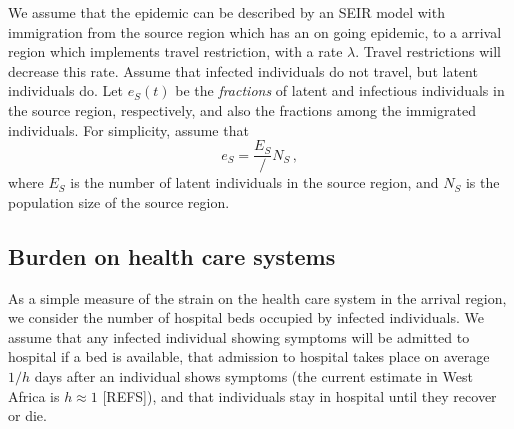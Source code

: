 \documentclass[12pt]{article}
\newcommand{\REFS}{{\color{red}[REFS]}\xspace}
\begin{document}
We assume that the epidemic can be described by an SEIR model with immigration from the source region which has an on going epidemic, to a arrival region which implements travel restriction, with a rate $\lambda$. Travel restrictions will decrease this rate. Assume that infected individuals do not travel, but latent individuals do. Let $e_S(t)$ be the \emph{fractions} of latent and infectious individuals in the source region, respectively, and also the fractions among the immigrated individuals. For simplicity, assume that
\begin{equation}
\label{eq:eS}
e_S=\frac{E_S}/{N_S}\,,
\end{equation}
where $E_S$ is the number of latent individuals in the source region, and $N_S$ is the population size of the source region.

\subsection{Burden on health care systems}
	
As a simple measure of the strain on the health care system in the arrival region, we consider the number of hospital beds occupied by infected individuals.  We assume that any infected individual showing symptoms will be admitted to hospital if a bed is available, that admission to hospital takes place on average $1/h$ days after an individual shows symptoms (the current estimate in West Africa is $h\approx 1$ \REFS), and that individuals stay in hospital until they recover or die.  
	
\end{document}
